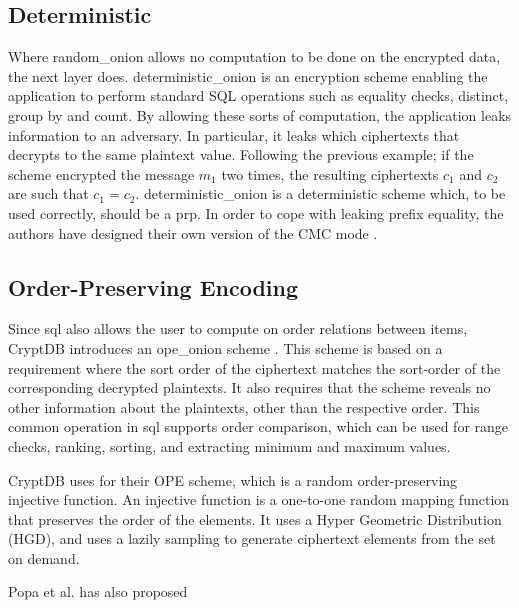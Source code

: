 \subsection{Deterministic}
Where \Gls{random_onion} allows no computation to be done on the encrypted data, the next layer does. \Gls{deterministic_onion} is an encryption scheme enabling the application to perform standard SQL operations such as equality checks, distinct, group by and count. By allowing these sorts of computation, the application leaks information to an adversary. In particular, it leaks which ciphertexts that decrypts to the same plaintext value. Following the previous example; if the scheme encrypted the message $m_1$ two times, the resulting ciphertexts $c_1$ and $c_2$ are such that $c_1 = c_2$. \Gls{deterministic_onion} is a deterministic scheme which, to be used correctly, should be a \Gls{prp}. In order to cope with leaking prefix equality, the authors have designed their own version of the CMC mode \cite{CryptDB_Main_Paper}.


\subsection{Order-Preserving Encoding}




Since \Gls{sql} also allows the user to compute on order relations between items, CryptDB introduces an \Gls{ope_onion} scheme \citep{CryptDB_Main_Paper}. This scheme is based on a requirement where the sort order of the ciphertext matches the sort-order of the corresponding decrypted plaintexts. It also requires that the scheme reveals no other information about the plaintexts, other than the respective order. This common operation in \Gls{sql} supports order comparison, which can be used for range checks, ranking, sorting, and extracting minimum and maximum values. 

CryptDB uses \citep{ope_cryptdb} for their OPE scheme, which is a random order-preserving injective function. An injective function is a one-to-one random mapping function that preserves the order of the elements. It uses a Hyper Geometric Distribution (HGD), and uses a lazily sampling to generate ciphertext elements from the set on demand.


Popa et al. has also proposed 



